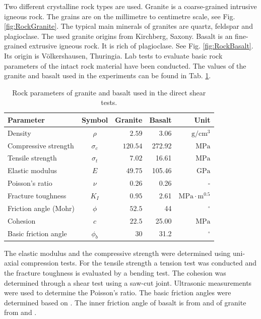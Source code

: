 Two different crystalline rock  types are used. Granite is a coarse-grained intrusive igneous rock. The grains are on the millimetre to centimetre scale, see Fig. \ref{fig:RockGranite}. The typical main minerals of granites are quartz, feldspar and plagioclase. The used granite origins from Kirchberg, Saxony.
%
Basalt is an fine-grained extrusive igneous rock. It is rich of plagioclase. See Fig. \ref{fig:RockBasalt}. Its origin is V\"olkershausen, Thuringia.
%
Lab tests to evaluate basic rock parameters of the intact rock material have been conducted. The values of the granite and basalt used in the experiments can be found in Tab. \ref{table:MEX7_rockParam}.

\begin{table}[!ht]
\begin{center}
\begin{tabular}{l c r r r}
Parameter & Symbol & Granite & Basalt & Unit\\
\hline
Density & $\rho$ & $2.59$ &3.06 &$\text{g}/\text{cm}^3$\\
Compressive strength & $\sigma_c$ & $120.54$&272.92 &$\text{MPa}   $\\
Tensile strength & $\sigma_t$ & $7.02$&16.61 &$ \text{MPa}   $\\
Elastic modulus & $E$ & $49.75$&105.46 &$ \text{GPa}   $\\
Poisson's ratio & $\nu$ & 0.26 & 0.26  & -\\
Fracture toughness & $K_I$ & $0.95$& 2.61 &$\text{MPa}\cdot\text{m}^{0.5}$\\
Friction angle (Mohr) & $\phi$ &  $52.5$& 44 &$^\circ$\\
Cohesion & $c$ &  $22.5$& 25.00  &$ \text{MPa}   $\\
Basic friction angle &$\phi_b$ &30 & 31.2 & $^\circ$\\
\end{tabular}
\caption{Rock parameters of granite and basalt used in the direct shear tests.}
\label{table:MEX7_rockParam}
\end{center}
\end{table}

The elastic modulus and the compressive strength were determined using uni-axial compression tests. For the tensile strength a tension test was conducted and the fracture toughness is evaluated by a bending test. The cohesion was determined through a shear test using a saw-cut joint. Ultrasonic measurements were used to determine the Poisson's ratio.
%
The basic friction angles were determined based on \cite{Alejano20121023}. The inner friction angle of basalt is from \cite{Schultz19951} and of granite from \cite{Lanaro2005} and \cite{Ramana2019273}.

